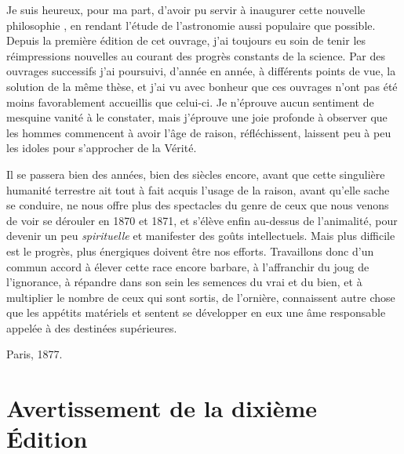\documentclass[a4paper, 11pt, oneside]{article}
\begin{document}
Je suis heureux, pour ma part, d'avoir pu servir à inaugurer cette nouvelle philosophie , en rendant l'étude de l'astronomie aussi populaire que possible. Depuis la première édition de cet ouvrage, j'ai toujours eu soin de tenir les réimpressions nouvelles au courant des progrès constants de la science. Par des ouvrages successifs j'ai poursuivi, d'année en année, à différents points de vue, la solution de la même thèse, et j'ai vu avec bonheur que ces ouvrages n'ont pas été moins favorablement accueillis que celui-ci. Je n'éprouve aucun sentiment de mesquine vanité à le constater, mais j'éprouve une joie profonde à observer que les hommes commencent à avoir l'âge de raison, réfléchissent, laissent peu à peu les idoles pour s'approcher de la Vérité.

Il se passera bien des années, bien des siècles encore, avant que cette singulière humanité terrestre ait tout à fait acquis l'usage de la raison, avant qu'elle sache se conduire, ne nous offre plus des spectacles du genre de ceux que nous venons de voir se dérouler en 1870 et 1871, et s'élève enfin au-dessus de l'animalité, pour devenir un peu \emph{spirituelle} et manifester des goûts intellectuels. Mais plus difficile est le progrès, plus énergiques doivent être nos efforts. Travaillons donc d'un commun accord à élever cette race encore barbare, à l'affranchir du joug de l'ignorance, à répandre dans son sein les semences du vrai et du bien, et à multiplier le nombre de ceux qui sont sortis, de l'ornière, connaissent autre chose que les appétits matériels et sentent se développer en eux une âme responsable appelée à des destinées supérieures.

\bigskip

Paris, 1877.
\clearpage
\section*{Avertissement de la dixième Édition}
\end{document}
